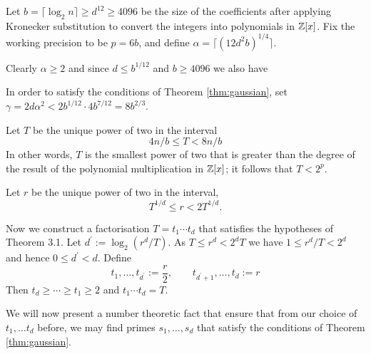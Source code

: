 Let $b = \lceil \log_2 n\rceil \geq d^{12} \geq 4096$ be the size of the coefficients after applying Kronecker substitution to convert the integers into polynomials in ${\mathbb Z}[x]$. Fix the working precision to be $p = 6b$, and define $\alpha = \lceil (12d^2 b)^{1/4}\rceil$.

Clearly $\alpha \geq 2$ and since $d \leq b^{1/12}$ and $b \geq 4096$ we also have



In order to satisfy the conditions of Theorem \ref{thm:gaussian}, set $\gamma = 2d\alpha^2 < 2b^{1/12} \cdot 4b^{7/12} = 8b^{2/3}$.

Let $T$ be the unique power of two in the interval
\begin{equation}
    4n/b \leq T < 8n/b
\end{equation}
In other words, $T$ is the smallest power of two that is greater than the degree of the result of the polynomial multiplication in ${\mathbb Z}[x]$; it follows that $T < 2^p$.

Let $r$ be the unique power of two in the interval,
\[
    T^{1/d} \leq r < 2T^{1/d}.
\]


Now we construct a factorisation $T = t_1 \cdots t_d$ that satisfies the hypotheses of Theorem 3.1. Let $d^\prime := \log_2(r^d / T)$. As $T \leq r^d < 2^d T$ we have $1 \leq r^d / T < 2^d$ and hence $0 \leq d^\prime < d$. Define
\[
    t_1, \ldots, t_{d^\prime} := \frac{r}{2}, \qquad t_{d^\prime + 1} , \ldots, t_d := r
\]
Then $t_d \geq \cdots \geq t_1 \geq 2$ and $t_1\cdots t_d = T$.

\medskip


\medskip

We will now present a number theoretic fact that ensure that from our choice of $t_1, \ldots t_d$ before, we may find primes $s_1, \ldots, s_d$ that satisfy the conditions of Theorem \ref{thm:gaussian}.

